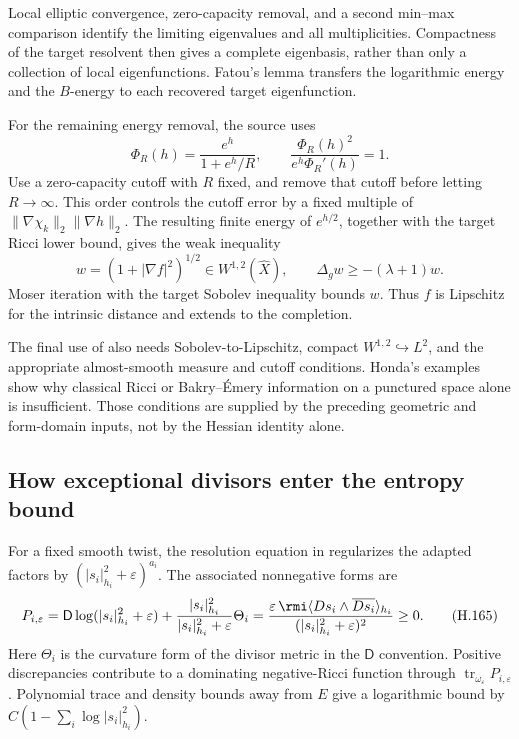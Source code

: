 Local elliptic convergence, zero-capacity removal, and a second
min--max comparison identify the limiting eigenvalues and all
multiplicities. Compactness of the target resolvent then gives a
complete eigenbasis, rather than only a collection of local
eigenfunctions. Fatou's lemma transfers the logarithmic energy
and the \(B\)-energy to each recovered target eigenfunction.

For the remaining energy removal, the source uses
\[
 \Phi_R(h)=\frac{e^h}{1+e^h/R},\qquad
 \frac{\Phi_R(h)^2}{e^h\Phi_R'(h)}=1 .
 \tag{H.163}\label{eq:appH-ricci-gradient-truncation}
\]
Use a zero-capacity cutoff with \(R\) fixed, and remove that
cutoff before letting \(R\to\infty\). This order controls the
cutoff error by a fixed multiple of
\(\|\nabla\chi_k\|_2\|\nabla h\|_2\).
The resulting finite energy of \(e^{h/2}\), together with the
target Ricci lower bound, gives the weak inequality
\[
 w=(1+|\nabla f|^2)^{1/2}\in W^{1,2}(\widehat X),\qquad
 \Delta_gw\geq-(\lambda+1)w .
 \tag{H.164}\label{eq:appH-ricci-moser-input}
\]
Moser iteration with the target Sobolev inequality bounds \(w\).
Thus \(f\) is Lipschitz for the intrinsic distance and extends
to the completion.

The final use of \cite{Honda18AlmostSmoothV3} also needs
Sobolev-to-Lipschitz, compact \(W^{1,2}\hookrightarrow L^2\),
and the appropriate almost-smooth measure and cutoff conditions.
Honda's examples show why classical Ricci or Bakry--Émery
information on a punctured space alone is insufficient.
Those conditions are supplied by the preceding geometric
and form-domain inputs, not by the Hessian identity alone.

\subsection{How exceptional divisors enter the entropy bound}

For a fixed smooth twist, the resolution equation in
\cite[Sections~4 and~6]{GSS26RicciEntropyV1}
regularizes the adapted factors by
\((|s_i|_{h_i}^2+\varepsilon)^{a_i}\).
The associated nonnegative forms are
\[
 P_{i,\varepsilon}=
 \mathsf D\log(|s_i|_{h_i}^2+\varepsilon)
 +\frac{|s_i|_{h_i}^2}{|s_i|_{h_i}^2+\varepsilon}\Theta_i
 =\frac{\varepsilon\,\rmi
       \langle D s_i\wedge\overline{D s_i}\rangle_{h_i}}
       {(|s_i|_{h_i}^2+\varepsilon)^2}\geq0 .
 \tag{H.165}\label{eq:appH-ricci-divisor-form}
\]
Here \(\Theta_i\) is the curvature form of the divisor metric
in the \(\mathsf D\) convention. Positive discrepancies contribute
to a dominating negative-Ricci function through
\(\operatorname{tr}_{\omega_\varepsilon}P_{i,\varepsilon}\).
Polynomial trace and density bounds away from \(E\) give a
logarithmic bound by \(C(1-\sum_i\log|s_i|_{h_i}^2)\).

